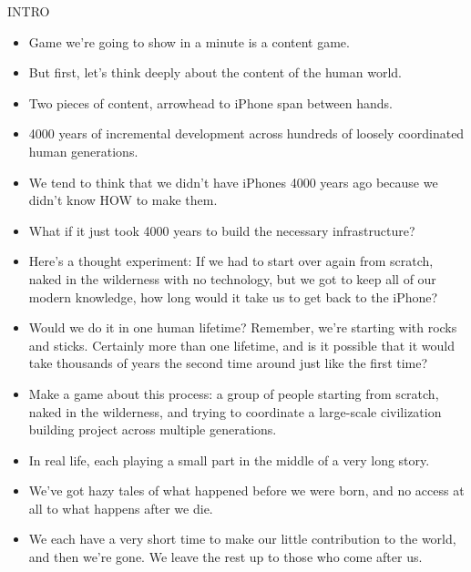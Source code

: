 \documentclass[12pt]{article}
\begin{document}
{\Huge

INTRO

\begin{itemize}

\item Game we're going to show in a minute is a content game.

\item But first, let's think deeply about the content of the human world.

\item Two pieces of content, arrowhead to iPhone span between hands.

\item 4000 years of incremental development across hundreds of loosely coordinated human generations.

\item We tend to think that we didn't have iPhones 4000 years ago because we didn't know HOW to make them.

\item What if it just took 4000 years to build the necessary infrastructure?

\item Here's a thought experiment:  If we had to start over again from scratch, naked in the wilderness with no technology, but we got to keep all of our modern knowledge, how long would it take us to get back to the iPhone?

\item Would we do it in one human lifetime?  Remember, we're starting with rocks and sticks.  Certainly more than one lifetime, and is it possible that it would take thousands of years the second time around just like the first time?

\item Make a game about this process:  a group of people starting from scratch, naked in the wilderness, and trying to coordinate a large-scale civilization building project across multiple generations.

\item In real life, each playing a small part in the middle of a very long story.

\item We've got hazy tales of what happened before we were born, and no access at all to what happens after we die.

\item We each have a very short time to make our little contribution to the world, and then we're gone.  We leave the rest up to those who come after us.


\end{itemize}}
\end{document}
